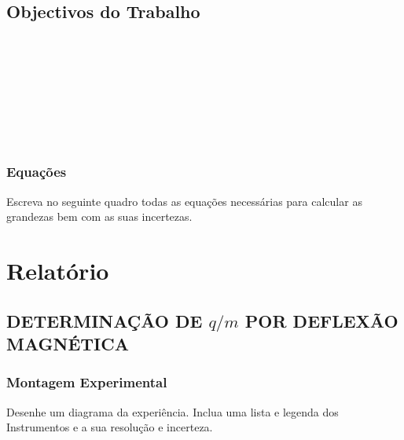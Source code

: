 \documentclass[a4paper,12pt]{article}  %
\begin{document}
\subsection{\sf Objectivos do Trabalho}
\noindent\underline{\makebox[\textwidth][r]{~}} \\
\noindent\underline{\makebox[\textwidth][r]{~}} \\
\noindent\underline{\makebox[\textwidth][r]{~}} \\
\noindent\underline{\makebox[\textwidth][r]{~}} \\
\noindent\underline{\makebox[\textwidth][r]{~}} \\
\noindent\underline{\makebox[\textwidth][r]{~}} \\
\noindent\underline{\makebox[\textwidth][r]{~}} \\

\subsubsection{\sf Equações }
Escreva no seguinte quadro todas as equações necessárias para calcular as grandezas bem com as suas incertezas.
\begin{center}
\framebox[13cm]{\rule{0pt}{6.5cm}}
\end{center}


\section{\sf Relatório}
\subsection{\sf DETERMINAÇÃO DE $q/m$ POR  DEFLEXÃO MAGNÉTICA}
\subsubsection{\sf Montagem Experimental}
Desenhe um diagrama da experiência. Inclua uma lista e legenda dos Instrumentos e a sua resolução e incerteza.
\begin{center}
\framebox[18cm]{\rule{0pt}{6.5cm}}
\end{center}




\end{document}
